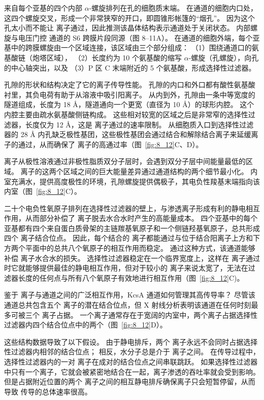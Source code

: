 来自每个亚基的四个内部 $\alpha$-螺旋排列在孔的细胞质末端。
在通道的细胞内口处，这四个螺旋交叉，形成一个非常狭窄的开口，即圆锥形帐篷的“烟孔”。
因为这个孔太小而不能让  离子通过，因此推测该晶体结构表示通道处于关闭状态。
内部螺旋与电压门控  通道的 S6 跨膜片段同源（图 8–11A）。
在通道的细胞外端，每个亚基中的跨膜螺旋由一个区域连接，该区域由三个部分组成：
（1）围绕通道口的氨基酸链（炮塔区域），
（2）长度约为 10 个氨基酸的缩写 $\alpha$-螺旋（孔螺旋），向孔的中心轴突出，以及
（3）P 区 C 末端附近的 5 个氨基酸，形成选择性过滤器。


孔隙的形状和结构决定了它的离子传导性能。
孔隙的内口和外口都有酸性氨基酸衬里，其负电荷有助于从溶液中吸引阳离子。
从内到外，孔隙由一条中等宽度的隧道组成，长度为 18 Å，隧道通向一个更宽（直径为 10 Å）的球形内腔。
这个内腔主要由疏水氨基酸侧链构成。
这些相对较宽的区域之后是非常窄的选择性过滤器，长度仅为 12 Å，这是  离子通过的速率限制。
从细胞质入口到选择性过滤器的 28 Å 内孔缺乏极性基团，这些极性基团会通过结合和解除结合离子来延缓离子的通过，从而确保了  离子的高通过率（图~\ref{fig:8_12}C、D）。


离子从极性溶液通过非极性脂质双分子层时，会遇到双分子层中间能量最低的区域。
 离子的这两个区域之间的巨大能量差异通过通道结构的两个细节最小化。
内室充满水，提供高度极性的环境，孔隙螺旋提供偶极子，其电负性羧基末端指向该内室（图~\ref{fig:8_12}C）。


二十个电负性氧原子排列在选择性过滤器的壁上，与渗透离子形成有利的静电相互作用，从而部分补偿了  离子脱去水合水时产生的高能量成本。
四个亚基中的每个亚基都有四个来自蛋白质骨架的主链羰基氧原子和一个侧链羟基氧原子，总共形成四个  离子结合位点。
因此，每个结合的  离子都能通过与位于结合阳离子上方和下方两个平面中的总共八个氧原子的相互作用而稳定。 
通过这种方式，该通道能够补偿  离子水合水的损失。
选择性过滤器稳定在一个临界宽度上，这样在  离子通过时它就能够提供最佳的静电相互作用，但对于较小的  离子来说太宽了，无法在过滤器长度的任何点与所有八个氧原子有效地进行相互作用（图~\ref{fig:8_12}C)。


鉴于  离子与通道之间的广泛相互作用，KcsA 通道如何管理其高传导率？
尽管该通道总共包含五个  离子的潜在结合位点，但 X 射线分析表明该通道在任何时刻最多可被三个  离子占据。
一个离子通常存在于宽阔的内室中，两个离子占据选择性过滤器内四个结合位点中的两个（图~\ref{fig:8_12}D）。


这些结构数据导致了以下假设。
由于静电排斥，两个  离子永远不会同时占据选择性过滤器内相邻的结合位点；
相反，水分子总是介于  离子之间。
在传导过程中，选择性过滤器内的一对  离子在成对的结合位点之间串联跳跃。
如果选择性过滤器中只有一个离子，它就会被紧密地结合在一起，离子渗透的吞吐率就会受到影响。
但是占据附近位置的两个  离子之间的相互静电排斥确保离子只会短暂停留，从而导致  传导的总体速率很高。


